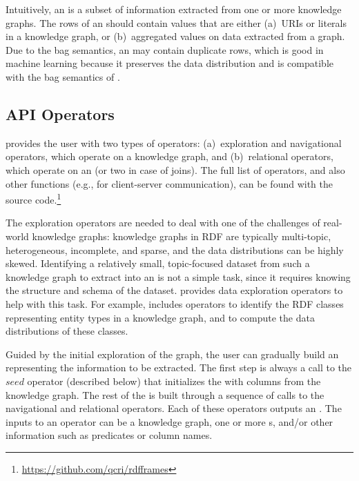 Intuitively, an \rdfframe is a subset of information extracted from one or more knowledge graphs. 
The rows of an \rdfframe should contain values that are either (a)~URIs or literals in a knowledge graph, or (b)~aggregated values on data extracted from a graph. 
Due to the bag semantics, an \rdfframe may contain duplicate rows,
which is good in machine learning because it preserves the data distribution and 
is compatible with the bag semantics of \sparql.


\subsection{API Operators}
\label{subsec:operators}


\rdfframes provides the user with two 
types of operators: (a)~exploration and navigational operators, which operate on a knowledge graph, and (b)~relational operators, which operate on an \rdfframe (or two in case of joins).
The full list of operators, and also other \rdfframes functions (e.g., for client-server communication), can be found with the source code.\footnote{\url{https://github.com/qcri/rdfframes}}


The \rdfframes exploration operators are needed to deal with one of the challenges of real-world knowledge graphs:
knowledge graphs in RDF are typically multi-topic, heterogeneous, incomplete, and sparse, and the data distributions can be highly skewed.
Identifying a relatively small, topic-focused dataset from such a knowledge graph
to extract into an \rdfframe is not a simple task, since it requires knowing the structure and schema of the dataset. \rdfframes provides data exploration operators to help with this task.
For example, \rdfframes includes operators to identify the RDF classes representing entity types
in a knowledge graph,
and to compute the data distributions of these classes.

Guided by the initial exploration of the graph, the user can gradually build an \rdfframe representing the
information to be extracted.
The first step
is always a call to 
the $seed$ operator (described below)
that initializes the \rdfframe with columns from the knowledge graph.
The rest of the \rdfframe is built through a sequence of calls to the \rdfframes navigational and relational operators.
Each of these operators outputs an \rdfframe.
The inputs to an operator can be a knowledge graph, one or more {\rdfframe}s, and/or other information such as predicates or column names.

